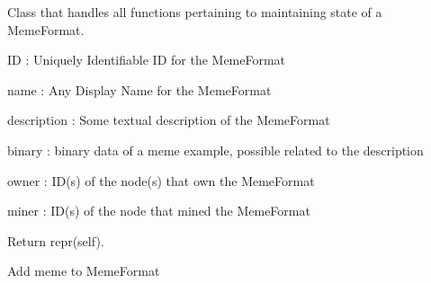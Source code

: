 \documentclass[letterpaper,10pt,english]{sphinxmanual}
\begin{document}
\begin{fulllineitems}
\label{\detokenize{index:node_state.MemeFormat}}
Class that handles all functions pertaining to maintaining state
of a MemeFormat.

\begin{fulllineitems}
\label{\detokenize{index:node_state.MemeFormat.__init__}}
ID : Uniquely Identifiable ID for the MemeFormat

name : Any Display Name for the MemeFormat

description : Some textual description of the MemeFormat

binary : binary data of a meme example, possible related to the description

owner : ID(s) of the node(s) that own the MemeFormat

miner : ID(s) of the node that mined the MemeFormat

\end{fulllineitems}


\begin{fulllineitems}
\label{\detokenize{index:node_state.MemeFormat.__repr__}}
Return repr(self).

\end{fulllineitems}


\begin{fulllineitems}
\label{\detokenize{index:node_state.MemeFormat.add_meme}}
Add meme to MemeFormat


\end{fulllineitems}
\end{fulllineitems}
\end{document}
